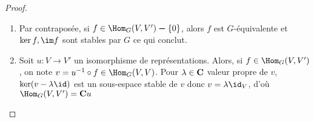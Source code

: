\begin{proof}
\begin{enumerate}
    \item Par contraposée, si $f \in  \Hom_G(V, V')\setminus  \left\{ 0 \right\} $, alors $f$ est  $G$-équivalente et  $\ker f, \im f$ sont stables par  $G$ ce qui conclut.
    \item Soit  $u:V\longrightarrow V'$ un isomorphisme de représentations. Alors, si $f \in  \Hom_G(V, V')$, on note $v=u^{-1}\circ f \in  \Hom_G(V,V)$. Pour $\lambda \in  \mathbf C$ valeur propre de $v$,  $\ker (v-\lambda \id)$ est un sous-espace stable de  $v$ donc  $v=\lambda\id_V$, d'où  $\Hom_G(V, V')=\C u$
\end{enumerate}
\end{proof}
